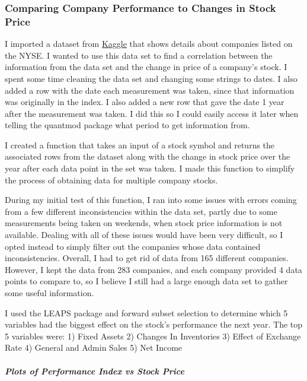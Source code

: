 \documentclass[]{article}
\let\oldsubparagraph\subparagraph
\renewcommand{\subparagraph}[1]{\oldsubparagraph{#1}\mbox{}}
\begin{document}
\hypertarget{comparing-company-performance-to-changes-in-stock-price}{%
\subsubsection{Comparing Company Performance to Changes in Stock
Price}\label{comparing-company-performance-to-changes-in-stock-price}}

I imported a dataset from
\href{https://www.kaggle.com/dgawlik/nyse/version/3\#}{Kaggle} that
shows details about companies listed on the NYSE. I wanted to use this
data set to find a correlation between the information from the data set
and the change in price of a company's stock. I spent some time cleaning
the data set and changing some strings to dates. I also added a row with
the date each measurement was taken, since that information was
originally in the index. I also added a new row that gave the date 1
year after the measurement was taken. I did this so I could easily
access it later when telling the quantmod package what period to get
information from.

I created a function that takes an input of a stock symbol and returns
the associated rows from the dataset along with the change in stock
price over the year after each data point in the set was taken. I made
this function to simplify the process of obtaining data for multiple
company stocks.

During my initial test of this function, I ran into some issues with
errors coming from a few different inconsistencies within the data set,
partly due to some measurements being taken on weekends, when stock
price information is not available. Dealing with all of these issues
would have been very difficult, so I opted instead to simply filter out
the companies whose data contained inconsistencies. Overall, I had to
get rid of data from 165 different companies. However, I kept the data
from 283 companies, and each company provided 4 data points to compare
to, so I believe I still had a large enough data set to gather some
useful information.

I used the LEAPS package and forward subset selection to determine which
5 variables had the biggest effect on the stock's performance the next
year. The top 5 variables were: 1) Fixed Assets 2) Changes In
Inventories 3) Effect of Exchange Rate 4) General and Admin Sales 5) Net
Income

\hypertarget{plots-of-performance-index-vs-stock-price}{%
\subparagraph{Plots of Performance Index vs Stock
Price}\label{plots-of-performance-index-vs-stock-price}}
\end{document}
